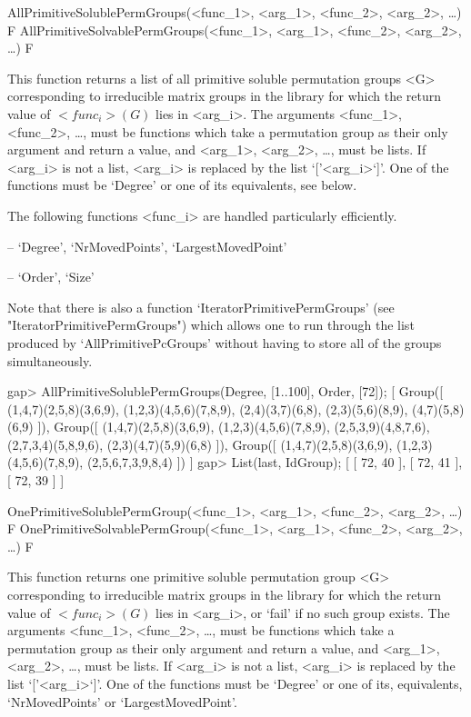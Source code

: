 \null


\>AllPrimitiveSolublePermGroups(<func_1>, <arg_1>, <func_2>, <arg_2>, \dots) F
\>AllPrimitiveSolvablePermGroups(<func_1>, <arg_1>, <func_2>, <arg_2>, \dots) F

This function returns a list of all primitive soluble permutation
groups <G> corresponding to irreducible matrix groups in the  {\IRREDSOL} library 
for which the return value of $<func_i>(G)$ lies
in <arg_i>.  The arguments <func_1>, <func_2>, \dots,
must be {\GAP} functions which take a permutation group as their only argument and return a
value, and <arg_1>, <arg_2>,
\dots,  must be lists. If <arg_i> is not a list, <arg_i> is replaced by the list
`['<arg_i>`]'. One of the functions must be `Degree' or one of its
equivalents, see below.

The following functions <func_i> are handled particularly efficiently. 

\beginlist%

\item{--} `Degree', `NrMovedPoints', `LargestMovedPoint'
\item{--} `Order', `Size'
\endlist

Note that there is also a function `IteratorPrimitivePermGroups' (see
"IteratorPrimitivePermGroups") which allows one to run through the list produced by
`AllPrimitivePcGroups' without having to store all of the groups
simultaneously.

\beginexample
gap> AllPrimitiveSolublePermGroups(Degree, [1..100], Order, [72]);
[ Group([ (1,4,7)(2,5,8)(3,6,9), (1,2,3)(4,5,6)(7,8,9), (2,4)(3,7)(6,8), 
      (2,3)(5,6)(8,9), (4,7)(5,8)(6,9) ]), 
  Group([ (1,4,7)(2,5,8)(3,6,9), (1,2,3)(4,5,6)(7,8,9), (2,5,3,9)(4,8,7,6), 
      (2,7,3,4)(5,8,9,6), (2,3)(4,7)(5,9)(6,8) ]), 
  Group([ (1,4,7)(2,5,8)(3,6,9), (1,2,3)(4,5,6)(7,8,9), (2,5,6,7,3,9,8,4) ]) ]
gap> List(last, IdGroup);
[ [ 72, 40 ], [ 72, 41 ], [ 72, 39 ] ]
\endexample


\>OnePrimitiveSolublePermGroup(<func_1>, <arg_1>, <func_2>, <arg_2>, \dots) F
\>OnePrimitiveSolvablePermGroup(<func_1>, <arg_1>, <func_2>, <arg_2>, \dots) F

This function returns one primitive soluble permutation
group <G> corresponding to irreducible matrix groups in the  {\IRREDSOL} library 
for which the return value of $<func_i>(G)$ lies in
<arg_i>, or `fail' if no such group exists.  The arguments <func_1>, <func_2>, \dots,
must be {\GAP} functions which take a permutation group as their only argument and return a
value, and <arg_1>, <arg_2>,
\dots,  must be lists. If <arg_i> is not a list, <arg_i> is replaced by the list
`['<arg_i>`]'. One of the functions must be `Degree' or one of its, equivalents, `NrMovedPoints' or `LargestMovedPoint'.

